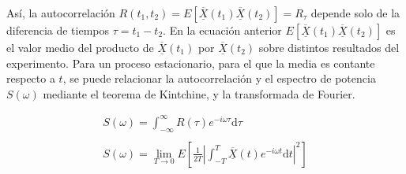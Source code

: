 As\'i, la autocorrelaci\'on $R(t_1, t_2) = E\left[\overline{\underline{X}}(t_1)\overline{\underline{X}}(t_2)\right] = R_\tau$ depende solo de la diferencia de tiempos $\tau = t_1 - t_2$. En la ecuación anterior $E\left[\overline{\underline{X}}(t_1)\overline{\underline{X}}(t_2)\right]$ es el valor medio del producto de $\overline{\underline{X}}(t_1)$ por $\overline{\underline{X}}(t_2)$ sobre distintos resultados del experimento. Para un proceso estacionario, para el que la media es contante respecto a $t$, se puede relacionar la autocorrelaci\'on y el espectro de potencia $S(\omega)$ mediante el teorema de Kintchine, y la transformada de Fourier.

	\begin{equation}
		\begin{matrix}
			S(\omega) = \int_{-\infty }^{\infty } R(\tau) e^{-i\omega\tau} \mathrm{d} \tau \\ \\
			S(\omega) = \lim_{T \rightarrow 0} E\left[\frac{1}{2T} \left| \int_{-T }^{T} \overline{\underline{X}}(t) e^{-i\omega t} \mathrm{d} t \right| ^2 \right ]
		\end{matrix}
		\label{eq:kintchine}
	\end{equation}




